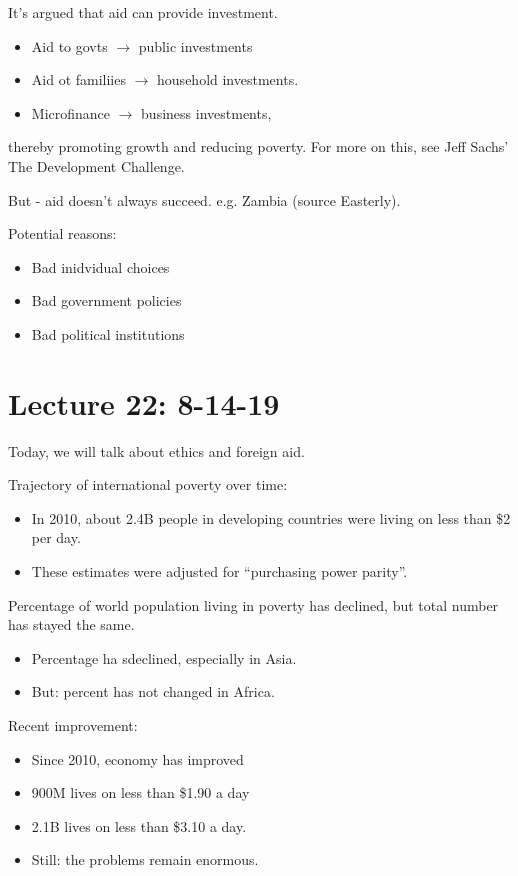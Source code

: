 \documentclass{article}
\begin{document}
It's argued that aid can provide investment.
\begin{itemize}
  \item Aid to govts $\to$ public investments
  \item Aid ot familiies $\to$ household investments.
  \item Microfinance $\to$ business investments,
\end{itemize}
thereby promoting growth and reducing poverty.  For more on this, see Jeff Sachs' The Development Challenge.

But - aid doesn't always succeed.  e.g. Zambia (source Easterly).

Potential reasons:
\begin{itemize}
  \item Bad inidvidual choices
  \item Bad government policies
  \item Bad political institutions
\end{itemize}



\section{Lecture 22: 8-14-19}

Today, we will talk about ethics and foreign aid.

Trajectory of international poverty over time:
\begin{itemize}
  \item In 2010, about 2.4B people in developing countries were living on less than \$2 per day.
  \item These estimates were adjusted for ``purchasing power parity''.
\end{itemize}

Percentage of world population living in poverty has declined, but total number has stayed the same.
\begin{itemize}
  \item Percentage ha sdeclined, especially in Asia.
  \item But: percent has not changed in Africa.
\end{itemize}

Recent improvement:


\begin{itemize}
  \item Since 2010, economy has improved
  \item 900M lives on less than \$1.90 a day
  \item 2.1B lives on less than \$3.10 a day.
  \item Still: the problems remain enormous.
\end{itemize}
\end{document}

